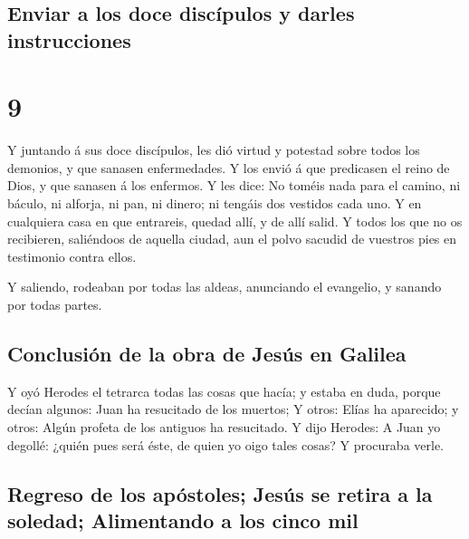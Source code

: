 \hypertarget{enviar-a-los-doce-discuxedpulos-y-darles-instrucciones}{%
\subsection{Enviar a los doce discípulos y darles
instrucciones}\label{enviar-a-los-doce-discuxedpulos-y-darles-instrucciones}}

\hypertarget{section-42-9}{%
\section{9}\label{section-42-9}}

 Y juntando á sus doce discípulos, les dió virtud y
potestad sobre todos los demonios, y que sanasen enfermedades.
 Y los envió á que predicasen el reino de Dios, y que
sanasen á los enfermos.  Y les dice: No toméis nada para
el camino, ni báculo, ni alforja, ni pan, ni dinero; ni tengáis dos
vestidos cada uno.  Y en cualquiera casa en que entrareis,
quedad allí, y de allí salid.  Y todos los que no os
recibieren, saliéndoos de aquella ciudad, aun el polvo sacudid de
vuestros pies en testimonio contra ellos.

 Y saliendo, rodeaban por todas las aldeas, anunciando el
evangelio, y sanando por todas partes.

\hypertarget{conclusiuxf3n-de-la-obra-de-jesuxfas-en-galilea}{%
\subsection{Conclusión de la obra de Jesús en
Galilea}\label{conclusiuxf3n-de-la-obra-de-jesuxfas-en-galilea}}

 Y oyó Herodes el tetrarca todas las cosas que hacía; y
estaba en duda, porque decían algunos: Juan ha resucitado de los
muertos;  Y otros: Elías ha aparecido; y otros: Algún
profeta de los antiguos ha resucitado.  Y dijo Herodes: A
Juan yo degollé: ¿quién pues será éste, de quien yo oigo tales cosas? Y
procuraba verle.

\hypertarget{regreso-de-los-apuxf3stoles-jesuxfas-se-retira-a-la-soledad-alimentando-a-los-cinco-mil}{%
\subsection{Regreso de los apóstoles; Jesús se retira a la soledad;
Alimentando a los cinco
mil}\label{regreso-de-los-apuxf3stoles-jesuxfas-se-retira-a-la-soledad-alimentando-a-los-cinco-mil}}

